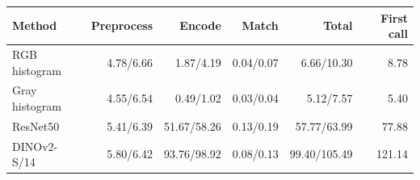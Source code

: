 \begin{tabular}{lrrrrr}
\toprule
Method & Preprocess & Encode & Match & Total & First call \\
\midrule
RGB histogram & 4.78/6.66 & 1.87/4.19 & 0.04/0.07 & 6.66/10.30 & 8.78 \\
Gray histogram & 4.55/6.54 & 0.49/1.02 & 0.03/0.04 & 5.12/7.57 & 5.40 \\
ResNet50 & 5.41/6.39 & 51.67/58.26 & 0.13/0.19 & 57.77/63.99 & 77.88 \\
DINOv2-S/14 & 5.80/6.42 & 93.76/98.92 & 0.08/0.13 & 99.40/105.49 & 121.14 \\
\bottomrule
\end{tabular}
